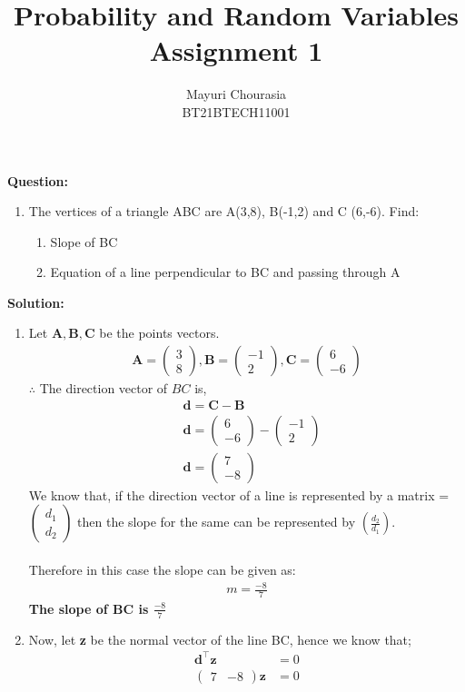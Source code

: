 \documentclass[journal,12pt,twocolumn]{IEEEtran}
\title{Probability and Random Variables\\Assignment 1}
\author{Mayuri Chourasia\\BT21BTECH11001}
\date{}
\let\vec\mathbf
\newcommand{\myvec}[1]{\ensuremath{\begin{pmatrix}#1\end{pmatrix}}}
\newcommand{\question}{\noindent \textbf{Question: }}
\newcommand{\solution}{\noindent \textbf{Solution: }}
\begin{document}
\maketitle
\question
\begin{enumerate}[label=]
\item The vertices of a triangle ABC are A(3,8), B(-1,2) and C (6,-6). Find:
\begin{enumerate}
    \item Slope of BC
    \item Equation of a line perpendicular to BC and passing through A
\end{enumerate}
\end{enumerate}
\solution
\begin{enumerate}
\item Let $\vec{A}, \vec{B}, \vec{C}$ be the points vectors.
	\begin{align}
		\vec{A} = \myvec{3 \\ 8} ,
		\vec{B} = \myvec{-1 \\ 2}  ,
		\vec{C} = \myvec{6 \\ -6}
	\end{align}
	$\therefore$ The direction vector of $BC$ is,
    \begin{align}
    &\vec{d} = \vec{C} - \vec{B}
    \\
	&\vec{d} = \myvec{6 \\ -6} - \myvec{-1 \\ 2}
	\\
	&\vec{d} = \myvec{7 \\ -8}
    \end{align}
    We know that, if the direction vector of a line is represented by a matrix \vec{d}=\myvec{d_1\\d_2} then the slope for the same can be represented by $(\frac{d_2}{d_1})$.\\
    \medskip\\
    Therefore in this case the slope can be given as:
    \begin{align}
        m=\frac{-8}{7}
    \end{align}
    \textbf{The slope of BC is $\frac{-8}{7}$}
    \medskip\\
\item Now, let \textbf{z} be the normal vector of the line BC, hence we know that;
    \begin{align}
	\vec{d}^{\top}\vec{z} &= 0
	\\
	\myvec{7 & -8}\vec{z} &= 0
	\\

\end{align}
\end{enumerate}
\end{document}
